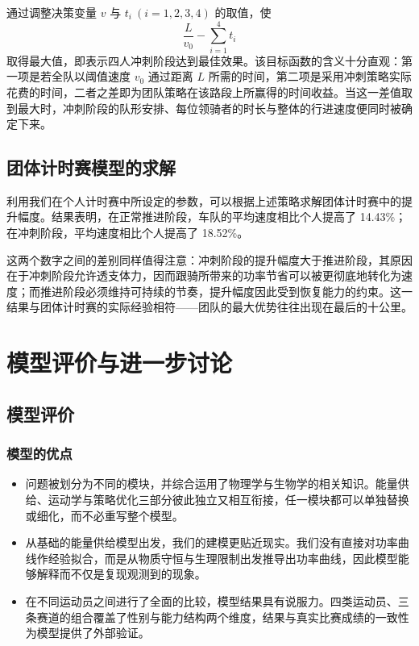 \documentclass[11pt,a4paper]{ctexart}
\begin{document}
通过调整决策变量 $v$ 与 $t_i\ (i=1,2,3,4)$ 的取值，使
\[
\frac{L}{v_0}-\sum_{i=1}^{4}t_i
\]
取得最大值，即表示四人冲刺阶段达到最佳效果。该目标函数的含义十分直观：第一项是若全队以阈值速度 $v_0$ 通过距离 $L$ 所需的时间，第二项是采用冲刺策略实际花费的时间，二者之差即为团队策略在该路段上所赢得的时间收益。当这一差值取到最大时，冲刺阶段的队形安排、每位领骑者的时长与整体的行进速度便同时被确定下来。

\subsection{团体计时赛模型的求解}

利用我们在个人计时赛中所设定的参数，可以根据上述策略求解团体计时赛中的提升幅度。结果表明，在正常推进阶段，车队的平均速度相比个人提高了 14.43\%；在冲刺阶段，平均速度相比个人提高了 18.52\%。

这两个数字之间的差别同样值得注意：冲刺阶段的提升幅度大于推进阶段，其原因在于冲刺阶段允许透支体力，因而跟骑所带来的功率节省可以被更彻底地转化为速度；而推进阶段必须维持可持续的节奏，提升幅度因此受到恢复能力的约束。这一结果与团体计时赛的实际经验相符——团队的最大优势往往出现在最后的十公里。

\section{模型评价与进一步讨论}

\subsection{模型评价}

\subsubsection{模型的优点}

\begin{itemize}
\item 问题被划分为不同的模块，并综合运用了物理学与生物学的相关知识。能量供给、运动学与策略优化三部分彼此独立又相互衔接，任一模块都可以单独替换或细化，而不必重写整个模型。
\item 从基础的能量供给模型出发，我们的建模更贴近现实。我们没有直接对功率曲线作经验拟合，而是从物质守恒与生理限制出发推导出功率曲线，因此模型能够解释而不仅是复现观测到的现象。
\item 在不同运动员之间进行了全面的比较，模型结果具有说服力。四类运动员、三条赛道的组合覆盖了性别与能力结构两个维度，结果与真实比赛成绩的一致性为模型提供了外部验证。
\end{itemize}
\end{document}
